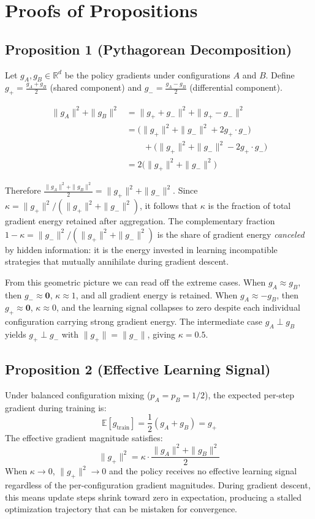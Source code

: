 \documentclass[letterpaper]{article}
\begin{document}
\section{Proofs of Propositions}

\subsection{Proposition 1 (Pythagorean Decomposition)}

Let $g_A, g_B \in \mathbb{R}^d$ be the policy gradients under configurations $A$ and $B$.
Define $g_+ = \frac{g_A + g_B}{2}$ (shared component) and $g_- = \frac{g_A - g_B}{2}$
(differential component).

\begin{align}
\|g_A\|^2 + \|g_B\|^2
&= \|g_+ + g_-\|^2 + \|g_+ - g_-\|^2 \nonumber\\
&= \bigl(\|g_+\|^2 + \|g_-\|^2 + 2 g_+ \!\cdot\! g_-\bigr) \nonumber\\
&\qquad + \bigl(\|g_+\|^2 + \|g_-\|^2 - 2 g_+ \!\cdot\! g_-\bigr) \nonumber\\
&= 2\bigl(\|g_+\|^2 + \|g_-\|^2\bigr)
\end{align}

Therefore $\frac{\|g_A\|^2 + \|g_B\|^2}{2} = \|g_+\|^2 + \|g_-\|^2$.
Since $\kappa = \|g_+\|^2 / (\|g_+\|^2 + \|g_-\|^2)$, it follows that $\kappa$ is the
fraction of total gradient energy retained after aggregation.
The complementary fraction $1-\kappa = \|g_-\|^2/(\|g_+\|^2 + \|g_-\|^2)$ is the
share of gradient energy \textit{canceled} by hidden information: it is the energy
invested in learning incompatible strategies that mutually annihilate during
gradient descent.

From this geometric picture we can read off the extreme cases. When $g_A \approx g_B$, then $g_- \approx \mathbf{0}$, $\kappa \approx 1$, and all gradient energy is retained. When $g_A \approx -g_B$, then $g_+ \approx \mathbf{0}$, $\kappa \approx 0$, and the learning signal collapses to zero despite each individual configuration carrying strong gradient energy. The intermediate case $g_A \perp g_B$ yields $g_+ \perp g_-$ with $\|g_+\| = \|g_-\|$, giving $\kappa = 0.5$.

\subsection{Proposition 2 (Effective Learning Signal)}

Under balanced configuration mixing ($p_A = p_B = 1/2$), the expected per-step
gradient during training is:
\begin{equation}
\mathbb{E}[g_{\text{train}}] = \frac{1}{2}(g_A + g_B) = g_+
\end{equation}
The effective gradient magnitude satisfies:
\begin{equation}
\|g_+\|^2 = \kappa \cdot \frac{\|g_A\|^2 + \|g_B\|^2}{2}
\end{equation}
When $\kappa \to 0$, $\|g_+\|^2 \to 0$ and the policy receives no effective
learning signal regardless of the per-configuration gradient magnitudes.
During gradient descent, this means update steps shrink toward zero in expectation, producing a stalled optimization trajectory that can be mistaken for convergence.
\end{document}
